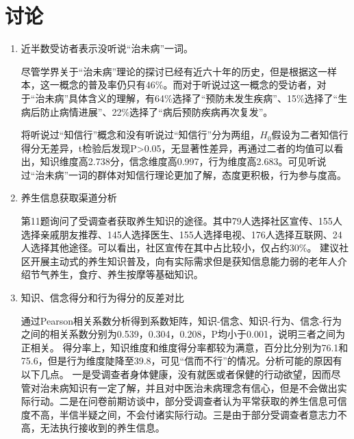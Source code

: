 \documentclass{article}
\begin{document}
\section{讨论}
\begin{enumerate}
    \item 近半数受访者表示没听说“治未病”一词。
    
    尽管学界关于“治未病”理论的探讨已经有近六十年的历史，但是根据这一样本，这一概念的普及率仍只有46\%。而对于听说过这一概念的受访者，对于“治未病”具体含义的理解，有64\%选择了“预防未发生疾病”、15\%选择了“生病后防止病情进展”、22\%选择了“病后预防疾病再次复发”。
    	
	将听说过“知信行”概念和没有听说过“知信行”分为两组，$H_0$假设为二者知信行得分无差异，t检验后发现P>0.05，无显著性差异，再通过二者的均值可以看出，知识维度高2.738分，信念维度高0.997，行为维度高2.683。可见听说过“治未病”一词的群体对知信行理论更加了解，态度更积极，行为参与度高。
	
    \item 养生信息获取渠道分析
    
    第11题询问了受调查者获取养生知识的途径。其中79人选择社区宣传、155人选择亲戚朋友推荐、145人选择医生、155人选择电视、176人选择互联网、24人选择其他途径。可以看出，社区宣传在其中占比较小，仅占约30\%。
	建议社区开展主动式的养生知识普及，向有实际需求但是获知信息能力弱的老年人介绍节气养生，食疗、养生按摩等基础知识。

	
	\item 知识、信念得分和行为得分的反差对比
	
	通过Pearson相关系数分析得到系数矩阵，知识-信念、知识-行为、信念-行为之间的相关系数分别为0.539，0.304，0.208，P均小于0.001，说明三者之间为正相关。
	得分率上，知识维度和维度得分率都较为满意，百分比分别为76.1和75.6，但是行为维度陡降至39.8，可见“信而不行”的情况。分析可能的原因有以下几点。
	一是受调查者身体健康，没有就医或者保健的行动欲望，因而尽管对治未病知识有一定了解，并且对中医治未病理念有信心，但是不会做出实际行动。二是在问卷前期访谈中，部分受调查者认为平常获取的养生信息可信度不高，半信半疑之间，不会付诸实际行动。三是由于部分受调查者意志力不高，无法执行接收到的养生信息。
	
\end{enumerate}
\printbibliography
\end{document}
